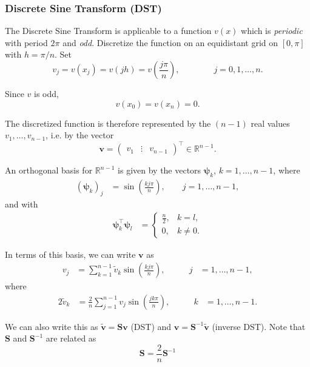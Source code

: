\subsubsection{Discrete Sine Transform (DST)}

The Discrete Sine Transform is applicable to a function $v(x)$ which is
\emph{periodic} with period $2 \pi$ and \emph{odd}. Discretize the function on
an equidistant grid on $[0,\pi]$ with $h=\pi/n$. Set
\begin{equation*}
  v_j = v(x_j) = v(jh) = v \left(\frac{j \pi}{n} \right), \qquad \qquad j=0,1,\ldots,n.
\end{equation*}

Since $v$ is odd,
\begin{equation*}
  v(x_0) = v(x_n) = 0.
\end{equation*}

The discretized function is therefore represented by the $(n-1)$ real values
$v_1,\ldots,v_{n-1}$, i.e. by the vector
\begin{equation*}
  \bm v = \begin{pmatrix} v_1 & \vdots & v_{n-1} \end{pmatrix}^\intercal
  \in \mathbb{R}^{n-1}.
\end{equation*}

An orthogonal basis for $\mathbb{R}^{n-1}$ is given by the vectors
$\bm \psi_k$, $k=1,\ldots,n-1$, where
\begin{align*}
  (\bm \psi_k)_j &= \sin \left( \frac{k j \pi}{n} \right), \qquad j=1,\ldots,n-1,
\end{align*}
and with
\begin{align*}
  \bm \psi_k^\intercal \bm \psi_l &=
  \begin{cases}
    \frac{n}{2}, & k=l, \\
    0, & k \not= 0.
  \end{cases}
\end{align*}

In terms of this basis, we can write $\bm v$ as
\begin{align*}
  v_j
  &= \sum_{k=1}^{n-1} \tilde{v}_k \sin \left( \frac{k j \pi}{n} \right), &\qquad j&=1,\ldots,n-1,
\end{align*}
where
\begin{align*}{2}
  \tilde{v}_k
  &= \frac{2}{n} \sum_{j=1}^{n-1} v_j \sin \left( \frac{j k \pi}{n} \right), &\qquad  k&=1,\ldots,n-1.
\end{align*}

We can also write this as $\tilde{\bm v} = \bm S \bm v$ (DST) and $\bm v = \bm
S^{-1} \tilde{\bm v}$ (inverse DST). Note that $\bm S$ and $\bm S^{-1}$ are
related as
\begin{equation*}
  \bm S = \frac{2}{n} \bm S^{-1}
\end{equation*}

